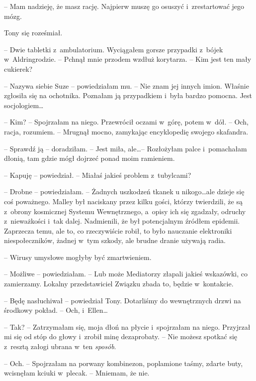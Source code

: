 \documentclass[oneside,polish,11pt,sfheadings]{mwbk}
\begin{document}
-- Mam nadzieję, że masz rację. Najpierw muszę go osuszyć i~zrestartować
jego mózg.

Tony się roześmiał. 

-- Dwie tabletki z~ambulatorium. Wyciągałem gorsze
przypadki z~bójek w~Aldringrodzie. -- Pchnął mnie przodem wzdłuż
korytarza. -- Kim jest ten mały cukierek?

-- Nazywa siebie Suze -- powiedziałam mu. -- Nie znam jej innych imion.
Właśnie zgłosiła się na ochotnika. Poznałam ją przypadkiem i~była bardzo
pomocna. Jest socjologiem\ldots 

-- Kim? -- Spojrzałam na niego. Przewrócił oczami w~górę, potem w~dół. -- Och, racja, rozumiem. -- Mrugnął mocno, zamykając encyklopedię swojego
skafandra.

-- Sprawdź ją -- doradziłam. -- Jest miła, ale\ldots  -- Rozłożyłam palce i~pomachałam dłonią, tam gdzie mógł dojrzeć ponad moim ramieniem.

-- Kapuję -- powiedział. -- Miałaś jakieś problem z~tubylcami?

-- Drobne -- powiedziałam. -- Żadnych uszkodzeń tkanek u nikogo\ldots  ale
dzieje się coś poważnego. Malley był naciskany przez kilku gości, którzy
twierdzili, że są z~obrony kosmicznej Systemu Wewnętrznego, a~opisy ich
się zgadzały, odruchy z~nieważkości i~tak dalej. Nadmienili, że był
potencjalnym źródłem epidemii. Zaprzecza temu, ale to, co rzeczywiście
robił, to było nauczanie elektroniki niespołeczników, żadnej w~tym
szkody, ale brudne dranie używają radia.

-- Wirusy umysłowe mogłyby być zmartwieniem.

-- Możliwe -- powiedziałam. -- Lub może Mediatorzy złapali jakieś
wskazówki, co zamierzamy. Lokalny przedstawiciel Związku zbada to,
będzie w~kontakcie.

-- Będę nasłuchiwał -- powiedział Tony. Dotarliśmy do wewnętrznych drzwi
na środkowy pokład. -- Och, i~Ellen\ldots 

-- Tak? -- Zatrzymałam się, moja dłoń na płycie i~spojrzałam na niego.
Przyjrzał mi się od stóp do głowy i~zrobił minę dezaprobaty. -- Nie
możesz spotkać się z~resztą załogi ubrana w~ten \textit{sposób}.

-- Och. -- Spojrzałam na porwany kombinezon, poplamione taśmy, zdarte
buty, wcisnęłam kciuki w~plecak. -- Mniemam, że nie.
\end{document}
